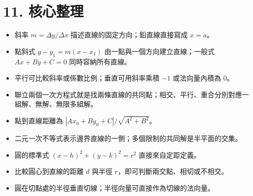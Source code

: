 \documentclass[11pt,a4paper]{article}
\providecommand{\tightlist}{%
  \setlength{\itemsep}{0pt}\setlength{\parskip}{0pt}}
\begin{document}
\section{11. 核心整理}\label{ux6838ux5fc3ux6574ux7406}

\begin{itemize}
\tightlist
\item
  斜率 \(m=\Delta y/\Delta x\) 描述直線的固定方向；鉛直線直接寫成 \(x=a\)。
\item
  點斜式 \(y-y_1=m(x-x_1)\) 由一點與一個方向建立直線；一般式 \(Ax+By+C=0\) 同時容納所有直線。
\item
  平行可比較斜率或係數比例；垂直可用斜率乘積 \(-1\) 或法向量內積為 \(0\)。
\item
  聯立兩個一次方程式就是找兩條直線的共同點；相交、平行、重合分別對應一組解、無解、無限多組解。
\item
  點到直線距離為 \(|Ax_0+By_0+C|/\sqrt{A^2+B^2}\)。
\item
  二元一次不等式表示邊界直線的一側；多個限制的共同解是半平面的交集。
\item
  圓的標準式 \((x-h)^2+(y-k)^2=r^2\) 直接來自定距定義。
\item
  比較圓心到直線的距離 \(d\) 與半徑 \(r\)，即可判斷兩交點、相切或不相交。
\item
  圓在切點處的半徑垂直切線；半徑向量可直接作為切線的法向量。
\end{itemize}
\end{document}
